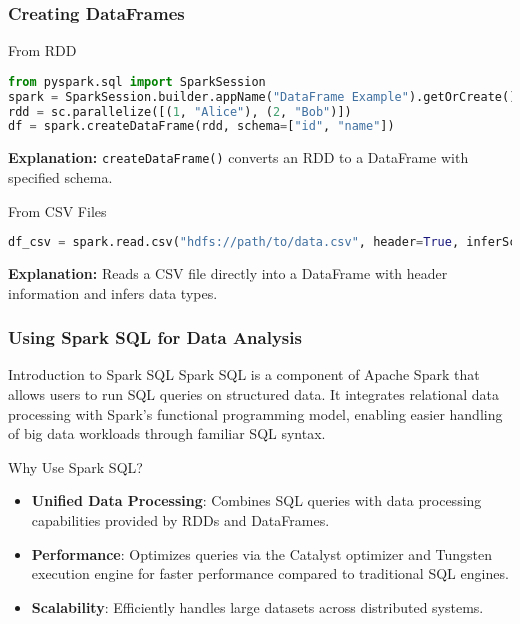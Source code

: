 \documentclass[aspectratio=169]{beamer}
\begin{document}
\begin{frame}[fragile]
  \frametitle{Creating DataFrames}
  \begin{block}{From RDD}
    \begin{lstlisting}[language=Python]
from pyspark.sql import SparkSession
spark = SparkSession.builder.appName("DataFrame Example").getOrCreate()
rdd = sc.parallelize([(1, "Alice"), (2, "Bob")])
df = spark.createDataFrame(rdd, schema=["id", "name"])
    \end{lstlisting}
    \textbf{Explanation:} \texttt{createDataFrame()} converts an RDD to a DataFrame with specified schema.
  \end{block}

  \begin{block}{From CSV Files}
    \begin{lstlisting}[language=Python]
df_csv = spark.read.csv("hdfs://path/to/data.csv", header=True, inferSchema=True)
    \end{lstlisting}
    \textbf{Explanation:} Reads a CSV file directly into a DataFrame with header information and infers data types.
  \end{block}
\end{frame}

\begin{frame}[fragile]
    \frametitle{Using Spark SQL for Data Analysis}
    \begin{block}{Introduction to Spark SQL}
        Spark SQL is a component of Apache Spark that allows users to run SQL queries on structured data. It integrates relational data processing with Spark's functional programming model, enabling easier handling of big data workloads through familiar SQL syntax.
    \end{block}
    
    \begin{block}{Why Use Spark SQL?}
        \begin{itemize}
            \item \textbf{Unified Data Processing}: Combines SQL queries with data processing capabilities provided by RDDs and DataFrames.
            \item \textbf{Performance}: Optimizes queries via the Catalyst optimizer and Tungsten execution engine for faster performance compared to traditional SQL engines.
            \item \textbf{Scalability}: Efficiently handles large datasets across distributed systems.
        \end{itemize}
    \end{block}
\end{frame}
\end{document}
